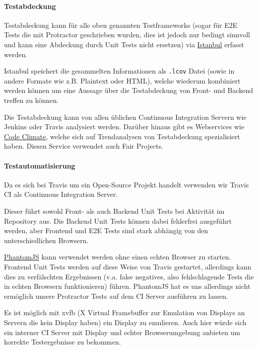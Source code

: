 \paragraph{Testabdeckung}\label{testabdeckung}

Testabdeckung kann für alle oben genannten Testframeworks (sogar für E2E
Tests die mit Protractor geschrieben wurden, dies ist jedoch nur bedingt
sinnvoll und kann eine Abdeckung durch Unit Tests nicht ersetzen) via
\href{https://gotwarlost.github.io/istanbul/}{Istanbul} erfasst werden.

Istanbul speichert die gesammelten Informationen als \texttt{.lcov}
Datei (sowie in andere Formate wie z.B. Plaintext oder HTML), welche
wiederum kombiniert werden können um eine Aussage über die Testabdeckung
von Front- und Backend treffen zu können.

Die Testabdeckung kann von allen üblichen Continuous Integration Servern
wie Jenkins oder Travis analysiert werden. Darüber hinaus gibt es
Webservices wie
\href{https://codeclimate.com/github/mihaeu/fair-projects/coverage}{Code
Climate}, welche sich auf Trendanalysen von Testabdeckung spezialisiert
haben. Diesen Service verwendet auch Fair Projects.

\paragraph{Testautomatisierung}\label{testautomatisierung}

Da es sich bei Travis um ein Open-Source Projekt handelt verwenden wir
Travis CI als Continuous Integration Server.

Dieser führt sowohl Front- als auch Backend Unit Tests bei Aktivität im
Repository aus. Die Backend Unit Tests können dabei fehlerfrei
ausgeführt werden, aber Frontend und E2E Tests sind stark abhängig von
den unterschiedlichen Browsern.

\href{http://phantomjs.org/}{PhantomJS} kann verwendet werden ohne einen
echten Browser zu starten. Frontend Unit Tests werden auf diese Weise
von Travis gestartet, allerdings kann dies zu verfälschten Ergebnissen
(v.a. false negatives, also fehlschlagende Tests die in echten Browsern
funktionieren) führen. PhantomJS hat es uns allerdings nicht ermöglich
unsere Protractor Tests auf dem CI Server ausführen zu lassen.

Es ist möglich mit xvfb (X Virtual Framebuffer zur Emulation von
Displays an Servern die kein Display haben) ein Display zu emulieren.
Auch hier würde sich ein interner CI Server mit Display und echter
Browserumgebung anbieten um korrekte Testergebnisse zu bekommen.

